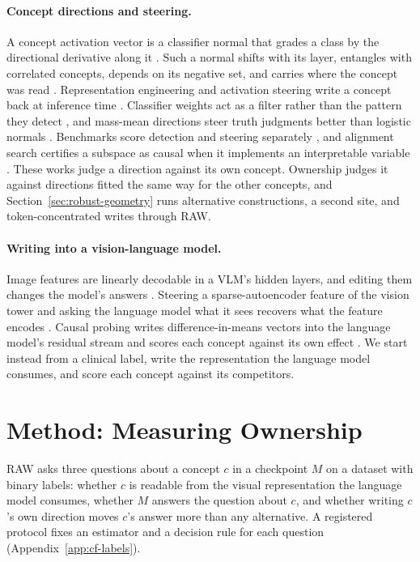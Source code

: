 \documentclass[11pt]{article}
\begin{document}
\paragraph{Concept directions and steering.}
A concept activation vector is a classifier normal that grades a class by the directional derivative along it \citep{kim2018tcav}. Such a normal shifts with its layer, entangles with correlated concepts, depends on its negative set, and carries where the concept was read \citep{nicolson2025explaining}. Representation engineering and activation steering write a concept back at inference time \citep{zou2023representation,turner2023steering,panickssery2024caa}. Classifier weights act as a filter rather than the pattern they detect \citep{haufe2014interpretation}, and mass-mean directions steer truth judgments better than logistic normals \citep{marks2024geometry}. Benchmarks score detection and steering separately \citep{wu2025axbench}, and alignment search certifies a subspace as causal when it implements an interpretable variable \citep{geiger2024alignments}. These works judge a direction against its own concept. Ownership judges it against directions fitted the same way for the other concepts, and Section~\ref{sec:robust-geometry} runs alternative constructions, a second site, and token-concentrated writes through RAW.

\paragraph{Writing into a vision-language model.}
Image features are linearly decodable in a VLM's hidden layers, and editing them changes the model's answers \citep{rajaram2025lineofsight}. Steering a sparse-autoencoder feature of the vision tower and asking the language model what it sees recovers what the feature encodes \citep{ferrando2026explain}. Causal probing writes difference-in-means vectors into the language model's residual stream and scores each concept against its own effect \citep{deng2026causal}. We start instead from a clinical label, write the representation the language model consumes, and score each concept against its competitors.

\section{Method: Measuring Ownership}
\label{sec:framework}

RAW asks three questions about a concept $c$ in a checkpoint $M$ on a dataset with binary labels: whether $c$ is readable from the visual representation the language model consumes, whether $M$ answers the question about $c$, and whether writing $c$'s own direction moves $c$'s answer more than any alternative. A registered protocol fixes an estimator and a decision rule for each question (Appendix~\ref{app:cf-labels}).
\end{document}
